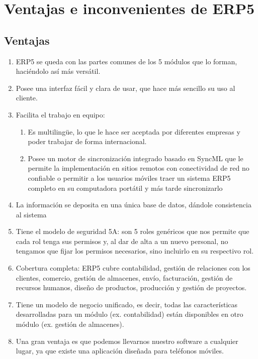 \chapter{Ventajas e inconvenientes de ERP5}
\section{Ventajas}

\begin{enumerate}
	\item ERP5 se queda con las partes comunes de los 5 módulos que lo forman, haciéndolo así más versátil.
	\item Posee una interfaz fácil y clara de usar, que hace más sencillo su uso al cliente.
	\item Facilita el trabajo en equipo: 
	\begin{enumerate}
		\item Es multilingüe, lo que le hace ser aceptada por diferentes empresas y poder trabajar de forma internacional.
		\item Posee un motor de sincronización integrado basado en SyncML que le permite la implementación en sitios remotos con conectividad de red no confiable o permitir a los usuarios móviles traer un sistema ERP5 completo en su computadora portátil y más tarde sincronizarlo 
	\end{enumerate} 
	\item La información se deposita en una única base de datos, dándole consistencia al sistema
	\item Tiene el modelo de seguridad 5A: son 5 roles genéricos que nos permite que cada rol tenga sus permisos y, al dar de alta a un nuevo personal, no tengamos que fijar los permisos necesarios, sino incluirlo en su respectivo rol.
	\item Cobertura completa: ERP5 cubre contabilidad, gestión de relaciones con los clientes, comercio, gestión de almacenes, envío, facturación, gestión de recursos humanos, diseño de productos, producción y gestión de proyectos.
	\item Tiene un modelo de negocio unificado, es decir, todas las características desarrolladas para un módulo (ex. contabilidad) están disponibles en otro módulo (ex. gestión de almacenes). 
	\item Una gran ventaja es que podemos llevarnos nuestro software a cualquier lugar, ya que existe una aplicación diseñada para teléfonos móviles.
\end{enumerate}


